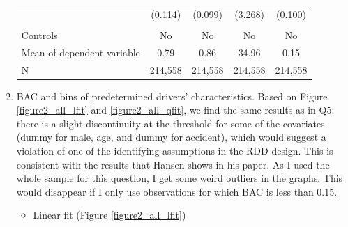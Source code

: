 \documentclass[11pt]{article}\usepackage[]{graphicx}\usepackage[]{color}
\begin{document}
\begin{enumerate}
\begin{table}[htbp]
\begin{center}
\begin{threeparttable}
\begin{tabular}{l*{4}{c}}
                    &     (0.114)   &     (0.099)   &     (3.268)   &     (0.100)   \\
			&		&			&		&			\\
Controls   & No			& No			& No 	& No \\
Mean of dependent variable&        0.79   &        0.86   &       34.96   &        0.15   \\
N                   &     214,558   &     214,558   &     214,558   &     214,558   \\
\bottomrule
\end{tabular}
\end{threeparttable}
\end{center}
\end{table}



 \item BAC and bins of predetermined drivers' characteristics.
 \newline
 Based on Figure \ref{figure2_all_lfit} and  \ref{figure2_all_qfit}, we find the same results as in Q5: there is a slight discontinuity at the threshold for some of the covariates (dummy for male, age, and dummy for accident), which would suggest a violation of one of the identifying assumptions in the RDD design. This is consistent with the results that Hansen shows in his paper. As I used the whole sample for this question, I get some weird outliers in the graphs. This would disappear if I only use observations for which BAC is less than 0.15.
 \begin{itemize}
 \item Linear fit (Figure \ref{figure2_all_lfit})
 

\end{itemize}
\end{enumerate}
\end{document}
